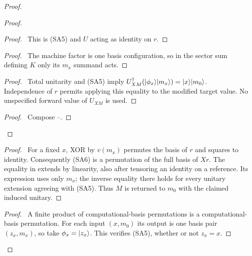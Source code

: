 \begin{proof}
 \begin{proof}
  \begin{proof}\pf\ This is (SA5) and $U$ acting as identity on $r$.
  \end{proof}
  \begin{proof}\pf\ The machine factor is one basis configuration,
  so in the sector sum defining $K$ only its $m_x$ summand acts.
  \end{proof}
  \begin{proof}\pf\ Total unitarity and (SA5) imply
  $U_{XM}^\dagger(\lvert \phi_x\rangle\lvert m_x\rangle)=\lvert x\rangle\lvert m_0\rangle$.
  Independence of $r$ permits applying this equality to the modified
  target value. No unspecified forward value of $U_{XM}$ is used.
  \end{proof}
  \qedstep
  \begin{proof}\pf\ Compose --.
  \end{proof}
 \end{proof}
 \begin{proof}\pf\ For a fixed $x$, XOR by $v(m_x)$ permutes the
 basis of $r$ and squares to identity. Consequently (SA6) is a
 permutation of the full basis of $Xr$. The equality in
  extends by linearity, also after tensoring
 an identity on a reference. Its expression uses only $m_x$; the
 inverse equality there holds for every unitary extension agreeing
 with (SA5). Thus $M$ is returned to $m_0$ with the claimed induced
 unitary.
 \end{proof}
 \begin{proof}\pf\ A finite product of computational-basis
 permutations is a computational-basis permutation. For each input
 $(x,m_0)$ its output is one basis pair $(z_x,m_x)$, so take
 $\phi_x=\lvert z_x\rangle$. This verifies (SA5), whether or not $z_x=x$.
 \end{proof}

\end{proof}
